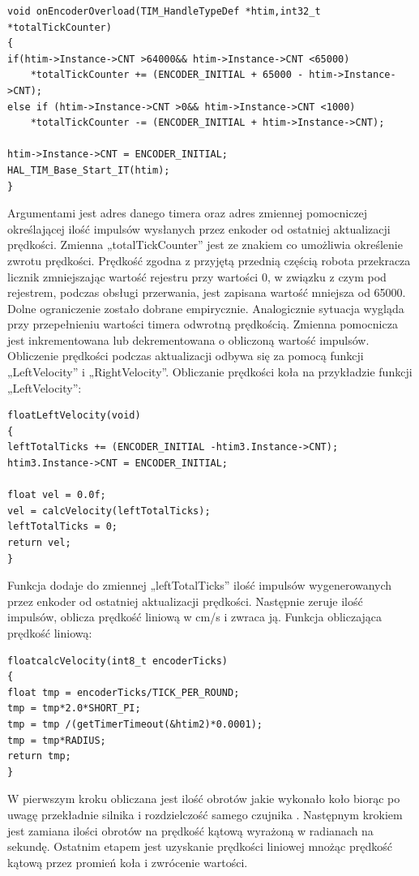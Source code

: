 \documentclass[eng,printmode]{mgr}
\begin{document}
\begin{lstlisting}[style=c]
void onEncoderOverload(TIM_HandleTypeDef *htim,int32_t *totalTickCounter)
{
if(htim->Instance->CNT >64000&& htim->Instance->CNT <65000)
	*totalTickCounter += (ENCODER_INITIAL + 65000 - htim->Instance->CNT);
else if (htim->Instance->CNT >0&& htim->Instance->CNT <1000)
	*totalTickCounter -= (ENCODER_INITIAL + htim->Instance->CNT);

htim->Instance->CNT = ENCODER_INITIAL;
HAL_TIM_Base_Start_IT(htim);
}

\end{lstlisting}
Argumentami jest adres danego timera oraz adres zmiennej pomocniczej określającej ilość impulsów wysłanych przez enkoder od ostatniej aktualizacji prędkości. Zmienna „totalTickCounter” jest ze znakiem co umożliwia określenie zwrotu prędkości. Prędkość zgodna z przyjętą przednią częścią robota przekracza licznik zmniejszając wartość rejestru przy wartości 0, w związku z czym pod rejestrem, podczas obsługi przerwania,  jest zapisana wartość mniejsza od 65000. Dolne ograniczenie zostało dobrane empirycznie. Analogicznie sytuacja wygląda przy przepełnieniu wartości timera odwrotną prędkością. Zmienna pomocnicza jest inkrementowana lub dekrementowana o obliczoną wartość impulsów.
\\Obliczenie prędkości podczas aktualizacji odbywa się za pomocą funkcji „LeftVelocity” i „RightVelocity”. Obliczanie prędkości koła na przykładzie funkcji „LeftVelocity”:
\begin{lstlisting}[style=c]
floatLeftVelocity(void)
{
leftTotalTicks += (ENCODER_INITIAL -htim3.Instance->CNT);
htim3.Instance->CNT = ENCODER_INITIAL;

float vel = 0.0f;
vel = calcVelocity(leftTotalTicks);
leftTotalTicks = 0;
return vel;
}

\end{lstlisting}

Funkcja dodaje do zmiennej „leftTotalTicks” ilość impulsów wygenerowanych przez enkoder od ostatniej aktualizacji prędkości. Następnie zeruje ilość impulsów, oblicza prędkość liniową w cm/s i zwraca ją. Funkcja obliczająca prędkość liniową:
\begin{lstlisting}[style=c]
floatcalcVelocity(int8_t encoderTicks)
{
float tmp = encoderTicks/TICK_PER_ROUND;
tmp = tmp*2.0*SHORT_PI;
tmp = tmp /(getTimerTimeout(&htim2)*0.0001);
tmp = tmp*RADIUS;
return tmp;
}

\end{lstlisting}

W pierwszym kroku obliczana jest ilość obrotów jakie wykonało koło biorąc po uwagę przekładnie silnika i rozdzielczość samego czujnika . Następnym krokiem jest zamiana ilości obrotów na prędkość kątową wyrażoną w radianach na sekundę. Ostatnim etapem jest uzyskanie prędkości liniowej mnożąc prędkość kątową przez promień koła i zwrócenie wartości.
\end{document}
